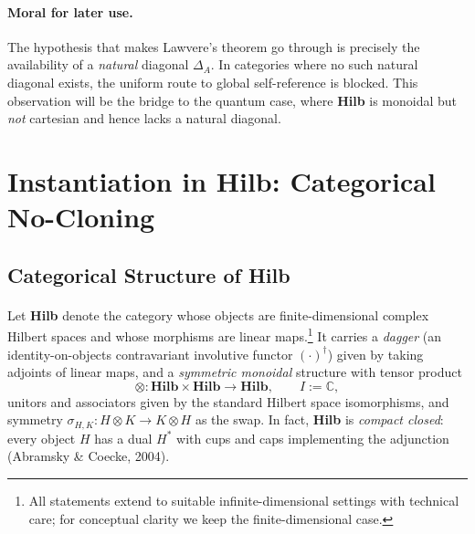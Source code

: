 \documentclass[11pt]{article}
\theoremstyle{upright}
\begin{document}
\paragraph{Moral for later use.}
The hypothesis that makes Lawvere’s theorem go through is precisely the availability of a \emph{natural} diagonal $\Delta_A$. In categories where no such natural diagonal exists, the uniform route to global self-reference is blocked. This observation will be the bridge to the quantum case, where \textbf{Hilb} is monoidal but \emph{not} cartesian and hence lacks a natural diagonal.

\section{Instantiation in \textbf{Hilb}: Categorical No-Cloning}
\label{sec:hilb}

\subsection{Categorical Structure of \textbf{Hilb}}

\paragraph{}
Let \textbf{Hilb} denote the category whose objects are finite-dimensional complex Hilbert spaces and whose morphisms are linear maps.\footnote{All statements extend to suitable infinite-dimensional settings with technical care; for conceptual clarity we keep the finite-dimensional case.} It carries a \emph{dagger} (an identity-on-objects contravariant involutive functor $(\cdot)^\dagger$) given by taking adjoints of linear maps, and a \emph{symmetric monoidal} structure with tensor product
\[
\otimes : \textbf{Hilb} \times \textbf{Hilb} \to \textbf{Hilb}, \qquad I := \mathbb{C},
\]
unitors and associators given by the standard Hilbert space isomorphisms, and symmetry $\sigma_{H,K}:H\otimes K \to K\otimes H$ as the swap. In fact, \textbf{Hilb} is \emph{compact closed}: every object $H$ has a dual $H^\ast$ with cups and caps implementing the adjunction (Abramsky \& Coecke, 2004).
\end{document}
